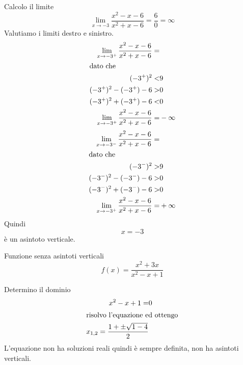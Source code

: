 Calcolo il limite \[ \lim_{x\to -3}\dfrac{x^2-x-6}{x^2+x-6}=\dfrac{6}{0}=\infty\] Valutiamo i limiti destro e sinistro. 
\begin{align*}
\lim_{x\to -3^+}\dfrac{x^2-x-6}{x^2+x-6}=&\\
\intertext{dato che}
(-3^+)^2<&9\\
(-3^+)^2-(-3^+)-6>&0\\
(-3^+)^2+(-3^+)-6<&0\\
\lim_{x\to -3^+}\dfrac{x^2-x-6}{x^2+x-6}=&-\infty\\
\end{align*}
\begin{align*}
\lim_{x\to -3^-}\dfrac{x^2-x-6}{x^2+x-6}=&\\
\intertext{dato che}
(-3^-)^2>&9\\
(-3^-)^2-(-3^-)-6>&0\\
(-3^-)^2+(-3^-)-6>&0\\
\lim_{x\to -3^+}\dfrac{x^2-x-6}{x^2+x-6}=&+\infty\\
\end{align*}
Quindi \[x=-3\] è un asintoto verticale.
\begin{cesempiot}{Funzione senza asintoti verticali}{}
	\[f(x)=\dfrac{x^2+3x}{x^2-x+1} \]
\end{cesempiot}
Determino il dominio
\begin{align*}
x^2-x+1=&0\\
\intertext{risolvo l'equazione ed ottengo}
x_{1,2}=\dfrac{1+\pm\sqrt{1-4}}{2}
\end{align*}
L'equazione non ha soluzioni  reali quindi è sempre definita, non ha asintoti verticali.
